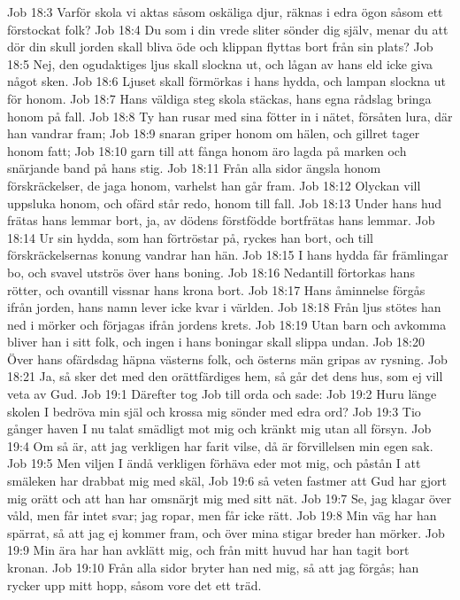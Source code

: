Job 18:3  Varför skola vi aktas såsom oskäliga djur, räknas i edra ögon såsom ett förstockat folk?
Job 18:4  Du som i din vrede sliter sönder dig själv, menar du att dör din skull jorden skall bliva öde och klippan flyttas bort från sin plats?
Job 18:5  Nej, den ogudaktiges ljus skall slockna ut, och lågan av hans eld icke giva något sken.
Job 18:6  Ljuset skall förmörkas i hans hydda, och lampan slockna ut för honom.
Job 18:7  Hans väldiga steg skola stäckas, hans egna rådslag bringa honom på fall.
Job 18:8  Ty han rusar med sina fötter in i nätet, försåten lura, där han vandrar fram;
Job 18:9  snaran griper honom om hälen, och gillret tager honom fatt;
Job 18:10  garn till att fånga honom äro lagda på marken och snärjande band på hans stig.
Job 18:11  Från alla sidor ängsla honom förskräckelser, de jaga honom, varhelst han går fram.
Job 18:12  Olyckan vill uppsluka honom, och ofärd står redo, honom till fall.
Job 18:13  Under hans hud frätas hans lemmar bort, ja, av dödens förstfödde bortfrätas hans lemmar.
Job 18:14  Ur sin hydda, som han förtröstar på, ryckes han bort, och till förskräckelsernas konung vandrar han hän.
Job 18:15  I hans hydda får främlingar bo, och svavel utströs över hans boning.
Job 18:16  Nedantill förtorkas hans rötter, och ovantill vissnar hans krona bort.
Job 18:17  Hans åminnelse förgås ifrån jorden, hans namn lever icke kvar i världen.
Job 18:18  Från ljus stötes han ned i mörker och förjagas ifrån jordens krets.
Job 18:19  Utan barn och avkomma bliver han i sitt folk, och ingen i hans boningar skall slippa undan.
Job 18:20  Över hans ofärdsdag häpna västerns folk, och österns män gripas av rysning.
Job 18:21  Ja, så sker det med den orättfärdiges hem, så går det dens hus, som ej vill veta av Gud.
Job 19:1  Därefter tog Job till orda och sade:
Job 19:2  Huru länge skolen I bedröva min själ och krossa mig sönder med edra ord?
Job 19:3  Tio gånger haven I nu talat smädligt mot mig och kränkt mig utan all försyn.
Job 19:4  Om så är, att jag verkligen har farit vilse, då är förvillelsen min egen sak.
Job 19:5  Men viljen I ändå verkligen förhäva eder mot mig, och påstån I att smäleken har drabbat mig med skäl,
Job 19:6  så veten fastmer att Gud har gjort mig orätt och att han har omsnärjt mig med sitt nät.
Job 19:7  Se, jag klagar över våld, men får intet svar; jag ropar, men får icke rätt.
Job 19:8  Min väg har han spärrat, så att jag ej kommer fram, och över mina stigar breder han mörker.
Job 19:9  Min ära har han avklätt mig, och från mitt huvud har han tagit bort kronan.
Job 19:10  Från alla sidor bryter han ned mig, så att jag förgås; han rycker upp mitt hopp, såsom vore det ett träd.
